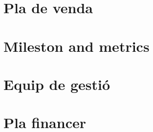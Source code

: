 \documentclass[12pt]{article}
\begin{document}
\section{Pla de venda}
\clearpage
\section{Mileston and metrics}
\clearpage
\section{Equip de gestió}
\clearpage
\section{Pla financer}
\clearpage
\appendix
\end{document}

